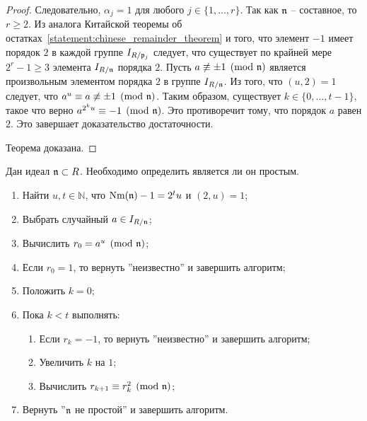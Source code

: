 \documentclass[_00_dissertation.tex]{subfiles}
\begin{document}
\begin{proof}
    Следовательно, $\alpha_j = 1$ для любого $j \in \{1, \ldots, r\}$.
    Так как $\mathfrak{n}$ -- составное, то $r \ge 2$.
    Из аналога Китайской теоремы об остатках~\ref{statement:chinese_remainder_theorem} и того, что элемент $-1$ имеет порядок $2$ в каждой группе $I_{R/\mathfrak{p}_j}$ следует, что существует по крайней мере $2^r-1 \ge 3$ элемента $I_{R/\mathfrak{n}}$ порядка $2$.
    Пусть $a \not\equiv \pm 1 \pmod{\mathfrak{n}}$ является произвольным элементом порядка $2$ в группе $I_{R/\mathfrak{n}}$.
    Из того, что $(u, 2) = 1$ следует, что $a^u \equiv a \not\equiv \pm 1 \pmod{\mathfrak{n}}$.
    Таким образом, существует $k \in \{0,\ldots, t-1\}$, такое что верно $a^{2^{k}u} \equiv -1 \pmod{\mathfrak{n}}$.
    Это противоречит тому, что порядок $a$ равен $2$.
    Это завершает доказательство достаточности.

    Теорема доказана.
\end{proof}

\begin{algorithm}\label{algorithm:miller_rabin}
    Дан идеал $\mathfrak{n} \subset R$.
    Необходимо определить является ли он простым.

    \begin{enumerate}
        \item Найти $u, t \in \mathbb{N}$, что $\textrm{Nm}(\mathfrak{n}) - 1 = 2^t u$ и $(2, u) = 1$;
        
        \item Выбрать случайный $a \in I_{R/\mathfrak{n}}$;

        \item Вычислить $r_0 = a^u \pmod{\mathfrak{n}}$;

        \item Если $r_0 = 1$, то вернуть ''неизвестно'' и завершить алгоритм;

        \item Положить $k = 0$;

        \item Пока $k < t$ выполнять:
        \begin{enumerate}
            \item Если $r_k = -1$, то вернуть ''неизвестно'' и завершить алгоритм;

            \item Увеличить $k$ на $1$;

            \item Вычислить $r_{k+1} \equiv r_k^2 \pmod{\mathfrak{n}}$;
        \end{enumerate}

        \item Вернуть ''$\mathfrak{n}$ не простой'' и завершить алгоритм.
    \end{enumerate}
\end{algorithm}
\end{document}
